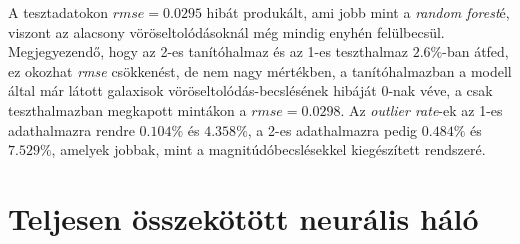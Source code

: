 \documentclass[12pt,letterpaper,twoside,openright]{book}
\begin{document}
A tesztadatokon $\textit{rmse} =0.0295$ hibát produkált, ami jobb mint a \textit{random forest}é, viszont az alacsony vöröseltolódásoknál még mindig enyhén felülbecsül. Megjegyezendő, hogy az 2-es tanítóhalmaz és az 1-es teszthalmaz $2.6\%$-ban átfed, ez okozhat \textit{rmse} csökkenést, de nem nagy mértékben, a tanítóhalmazban a modell által már látott galaxisok vöröseltolódás-becslésének hibáját $0$-nak véve, a csak teszthalmazban megkapott mintákon a $rmse = 0.0298$. Az \textit{outlier rate}-ek az 1-es adathalmazra rendre $0.104\%$ és $4.358\%$, a 2-es adathalmazra pedig $0.484\%$ és $7.529\%$, amelyek jobbak, mint a magnitúdóbecslésekkel kiegészített rendszeré.
\section{Teljesen összekötött neurális háló}
\end{document}
